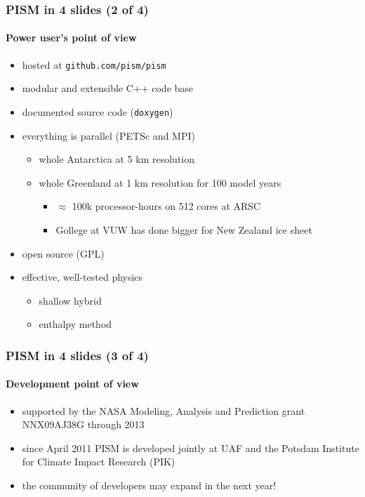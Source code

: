 \documentclass[hide notes,intlimits]{beamer}
\begin{document}
\begin{frame}
  \frametitle{PISM in 4 slides (2 of 4)}
  \framesubtitle{Power user's point of view}
  \begin{itemize}
  \item hosted at \texttt{github.com/pism/pism}
  \item modular and extensible C++ code base
  \item documented source code (\texttt{doxygen})
  \item everything is parallel (PETSc and MPI)
    \begin{itemize}
    \item whole Antarctica at 5 km resolution
    \item whole Greenland at 1 km resolution for 100 model years
      \begin{itemize}
      \item $\approx$ 100k processor-hours on 512 cores at ARSC
      \item Gollege at VUW has done bigger for New Zealand ice sheet
      \end{itemize}
    \end{itemize}
  \item open source (GPL)
  \item effective, well-tested physics
    \begin{itemize}
    \item shallow hybrid
    \item enthalpy method
   \end{itemize}
  \end{itemize}
\end{frame}

\begin{frame}
  \frametitle{PISM in 4 slides (3 of 4)}
  \framesubtitle{Development point of view}
  \begin{itemize}
 \item supported by the NASA Modeling, Analysis and Prediction grant NNX09AJ38G
   through 2013
  \item since April 2011 PISM is developed jointly at UAF and the Potsdam
    Institute for Climate Impact Research (PIK)
  \item the community of developers may expand in the next year!
  \end{itemize}
\end{frame}
\end{document}
